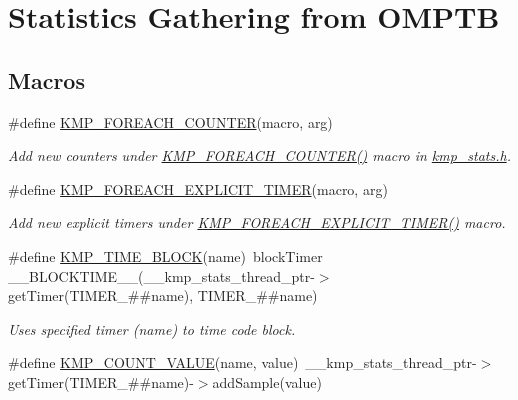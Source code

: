 \hypertarget{group__STATS__GATHERING}{\section{Statistics Gathering from O\-M\-P\-T\-B}
\label{group__STATS__GATHERING}
}
\subsection*{Macros}
\begin{DoxyCompactItemize}
\item 
\#define \hyperlink{group__STATS__GATHERING_ga49fb18e6ba9abac7dcf1f9a202741b66}{K\-M\-P\-\_\-\-F\-O\-R\-E\-A\-C\-H\-\_\-\-C\-O\-U\-N\-T\-E\-R}(macro, arg)
\begin{DoxyCompactList}\small\item\em Add new counters under \hyperlink{group__STATS__GATHERING_ga49fb18e6ba9abac7dcf1f9a202741b66}{K\-M\-P\-\_\-\-F\-O\-R\-E\-A\-C\-H\-\_\-\-C\-O\-U\-N\-T\-E\-R()} macro in \hyperlink{kmp__stats_8h_source}{kmp\-\_\-stats.\-h}. \end{DoxyCompactList}\item 
\#define \hyperlink{group__STATS__GATHERING_gab0bd69c3ce378f4f7079276311e034c0}{K\-M\-P\-\_\-\-F\-O\-R\-E\-A\-C\-H\-\_\-\-E\-X\-P\-L\-I\-C\-I\-T\-\_\-\-T\-I\-M\-E\-R}(macro, arg)
\begin{DoxyCompactList}\small\item\em Add new explicit timers under \hyperlink{group__STATS__GATHERING_gab0bd69c3ce378f4f7079276311e034c0}{K\-M\-P\-\_\-\-F\-O\-R\-E\-A\-C\-H\-\_\-\-E\-X\-P\-L\-I\-C\-I\-T\-\_\-\-T\-I\-M\-E\-R()} macro. \end{DoxyCompactList}\item 
\#define \hyperlink{group__STATS__GATHERING_ga62f4b6e3a4ba48c04b172b97df137839}{K\-M\-P\-\_\-\-T\-I\-M\-E\-\_\-\-B\-L\-O\-C\-K}(name)~block\-Timer \-\_\-\-\_\-\-B\-L\-O\-C\-K\-T\-I\-M\-E\-\_\-\-\_\-(\-\_\-\-\_\-kmp\-\_\-stats\-\_\-thread\-\_\-ptr-\/$>$get\-Timer(T\-I\-M\-E\-R\-\_\-\#\#name), T\-I\-M\-E\-R\-\_\-\#\#name)
\begin{DoxyCompactList}\small\item\em Uses specified timer (name) to time code block. \end{DoxyCompactList}\item 
\#define \hyperlink{group__STATS__GATHERING_ga7691000a7864b475046ae62fcf0536ac}{K\-M\-P\-\_\-\-C\-O\-U\-N\-T\-\_\-\-V\-A\-L\-U\-E}(name, value)~\-\_\-\-\_\-kmp\-\_\-stats\-\_\-thread\-\_\-ptr-\/$>$get\-Timer(T\-I\-M\-E\-R\-\_\-\#\#name)-\/$>$add\-Sample(value)

\end{DoxyCompactItemize}
